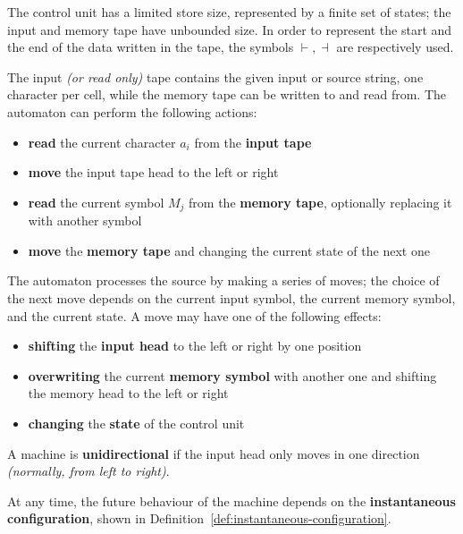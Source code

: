\documentclass[english]{article}
\begin{document}
The control unit has a limited store size, represented by a finite set of states;
the input and memory tape have unbounded size.
In order to represent the start and the end of the data written in the tape, the symbols \(\vdash, \dashv\) are respectively used.

The input \textit{(or read only)} tape contains the given input or source string, one character per cell, while the memory tape can be written to and read from.
The automaton can perform the following actions:

\begin{itemize}
  \item \textbf{read} the current character \(a_i\) from the \textbf{input tape}
  \item \textbf{move} the input tape head to the left or right
  \item \textbf{read} the current symbol \(M_j\) from the \textbf{memory tape}, optionally replacing it with another symbol
  \item \textbf{move} the \textbf{memory tape} and changing the current state of the next one
\end{itemize}

The automaton processes the source by making a series of moves;
the choice of the next move depends on the current input symbol, the current memory symbol, and the current state.
A move may have one of the following effects:

\begin{itemize}
  \item \textbf{shifting} the \textbf{input head} to the left or right by one position
  \item \textbf{overwriting} the current \textbf{memory symbol} with another one and shifting the memory head to the left or right
  \item \textbf{changing} the \textbf{state} of the control unit
\end{itemize}

A machine is \textbf{unidirectional} if the input head only moves in one direction \textit{(normally, from left to right)}.

\bigskip
At any time, the future behaviour of the machine depends on the \textbf{instantaneous configuration}, shown in Definition~\ref{def:instantaneous-configuration}.
\end{document}
